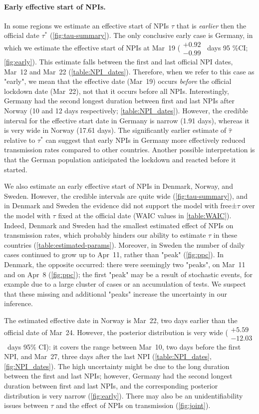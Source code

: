 \documentclass[12pt]{extarticle}
\begin{document}
\paragraph*{Early effective start of NPIs.}
In some regions we estimate an effective start of NPIs $\tau$ that is \emph{earlier} then the official date $\tau^*$ (\autoref{fig:tau-summary}).
The only conclusive early case is Germany, in which we estimate the effective start of NPIs at Mar~19 ($\substack{+0.92 \\ -0.99}$~days 95 \%CI; \autoref{fig:early}).
This estimate falls between the first and last official NPI dates, Mar~12 and Mar~22 (\autoref{table:NPI_dates}). Therefore, when we refer to this case as "early", we mean that the effective date (Mar~19) occurs \emph{before} the official lockdown date (Mar~22), not that it occurs before all NPIs.
Interestingly, Germany had the second longest duration between first and last NPIs after Norway (10 and 12 days respectively; \autoref{table:NPI_dates}).
However, the credible interval for the effective start date in Germany is narrow (1.91 days), whereas it is very wide in Norway (17.61 days).
The significantly earlier estimate of $\hat{\tau}$ relative to $\tau^*$ can suggest that early NPIs in Germany more effectively reduced transmission rates compared to other countries. Another possible interpretation is that the German population anticipated the lockdown and reacted before it started.

We also estimate an early effective start of NPIs in Denmark, Norway, and Sweden.
However, the credible intervals are quite wide (\autoref{fig:tau-summary}), and in Denmark and Sweden the evidence did not support the model with free±$\tau$ over the model with $\tau$ fixed at the official date (WAIC values in \autoref{table:WAIC}).
Indeed, Denmark and Sweden had the smallest estimated effect of NPIs on transmission rates, which  probably hinders our ability to estimate $\tau$ in these countries (\autoref{table:estimated-params}).
Moreover, in Sweden the number of daily cases continued to grow up to Apr~11, rather than "peak" (\autoref{fig:ppc}). 
In Denmark, the opposite occurred: there were seemingly two "peaks", on Mar~11 and on Apr~8 (\autoref{fig:ppc}); the first "peak" may be a result of stochastic events, for example due to a large cluster of cases or an accumulation of tests.
We suspect that these missing and additional "peaks" increase the uncertainty in our inference.

The estimated effective date in Norway is Mar~22, two days earlier than the official date of Mar~24.
However, the posterior distribution is very wide ($\substack{+5.59 \\ -12.03}$~days 95\% CI): it covers the range between Mar~10, two days before the first NPI, and Mar~27, three days after the last NPI (\autoref{table:NPI_dates}, \autoref{fig:NPI_dates}). 
The high uncertainty might be due to the long duration between the first and last NPIs; however, Germany had the second longest duration between first and last NPIs, and the corresponding posterior distribution is very narrow (\autoref{fig:early}).
There may also be an unidentifiability issues between $\tau$ and the effect of NPIs on transmission (\autoref{fig:joint}). 
\end{document}
